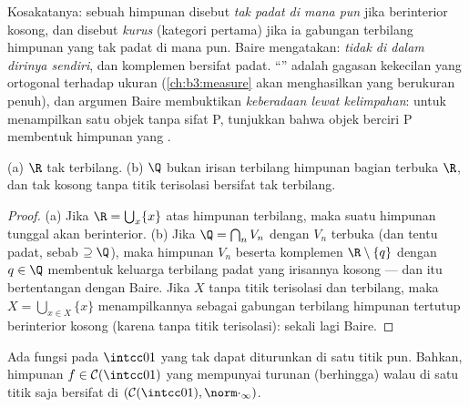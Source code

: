 \begin{remark}\label{rem:b3:complete:meagre}
Kosakatanya: sebuah himpunan disebut \emph{tak padat di mana pun} jika 
berinterior kosong, dan disebut \emph{kurus} (kategori pertama)
jika ia gabungan terbilang himpunan yang tak padat di mana pun. Baire mengatakan:
\emph{ tidak  di dalam dirinya sendiri}, dan
komplemen  bersifat padat. ``'' adalah gagasan
kekecilan yang ortogonal terhadap ukuran (\cref{ch:b3:measure} akan
menghasilkan  yang berukuran penuh), dan argumen Baire membuktikan
\emph{keberadaan lewat kelimpahan}: untuk menampilkan satu objek tanpa
sifat P, tunjukkan bahwa objek berciri P membentuk himpunan yang .
\end{remark}

\begin{corollary}\label{cor:b3:complete:bairecors}
(a) $\R$ tak terbilang. (b) $\Q$ bukan irisan terbilang
himpunan bagian terbuka $\R$, dan  tak kosong
tanpa titik terisolasi bersifat tak terbilang.
\end{corollary}

\begin{proof}
(a) Jika $\R = \bigcup_{x}\{x\}$ atas himpunan terbilang, maka suatu
himpunan tunggal akan berinterior. (b) Jika $\Q = \bigcap_n V_n$ dengan $V_n$
terbuka (dan tentu padat, sebab $\supseteq \Q$), maka himpunan
$V_n$ beserta komplemen $\R\setminus\{q\}$ dengan $q \in \Q$ membentuk
keluarga terbilang  padat yang irisannya kosong ---
dan itu bertentangan dengan Baire. Jika $X$  tanpa titik terisolasi
dan terbilang, maka $X = \bigcup_{x \in X}\{x\}$ menampilkannya sebagai
gabungan terbilang himpunan tertutup berinterior kosong (karena tanpa titik
terisolasi): sekali lagi Baire.
\end{proof}

\begin{theorem}
\label{thm:b3:complete:nowherediff}
Ada fungsi  pada $\intcc01$ yang tak dapat diturunkan di
satu titik pun. Bahkan, himpunan $f \in \mathcal C(\intcc01)$
yang mempunyai turunan (berhingga) walau di satu titik saja bersifat  di
$(\mathcal C(\intcc01), \norm\cdot_\infty)$.
\end{theorem}

